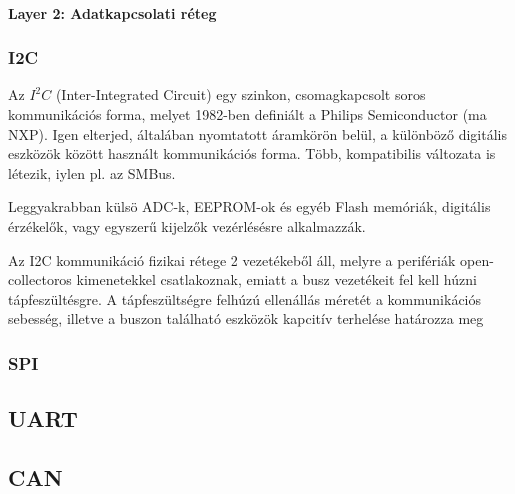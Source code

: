\paragraph{Layer 2: Adatkapcsolati réteg}

\subsubsection{I2C}

Az $I^2C$ (Inter-Integrated Circuit) egy szinkon, csomagkapcsolt soros kommunikációs forma, melyet 1982-ben definiált a Philips Semiconductor (ma NXP). Igen elterjed, általában nyomtatott áramkörön belül, a különböző digitális eszközök között használt kommunikációs forma. Több, kompatibilis változata is létezik, iylen pl. az SMBus.

Leggyakrabban külsö ADC-k, EEPROM-ok és egyéb Flash memóriák, digitális érzékelők,  vagy egyszerű kijelzők vezérlésésre alkalmazzák.

Az I2C kommunikáció fizikai rétege 2 vezetékeből áll, melyre a perifériák open-collectoros kimenetekkel csatlakoznak, emiatt a busz vezetékeit fel kell húzni tápfeszültésgre. A tápfeszültségre felhúzú ellenállás méretét a kommunikációs sebesség, illetve a buszon található eszközök kapcitív terhelése határozza meg


\subsubsection{SPI}
\subsection{UART}
\subsection{CAN}


\vspace{-1.5mm}
\newpage